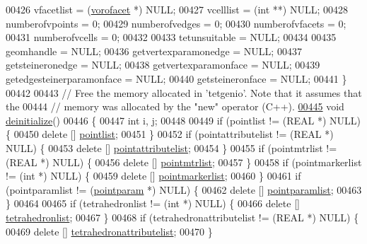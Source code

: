 \begin{DoxyCode}
00426     vfacetlist = (\hyperlink{structtetgenio_1_1vorofacet}{vorofacet} *) NULL; 
00427     vcelllist = (\textcolor{keywordtype}{int} **) NULL; 
00428     numberofvpoints = 0;
00429     numberofvedges = 0;
00430     numberofvfacets = 0;
00431     numberofvcells = 0;
00432 
00433     tetunsuitable = NULL;
00434 
00435     geomhandle = NULL;
00436     getvertexparamonedge = NULL;
00437     getsteineronedge = NULL;
00438     getvertexparamonface = NULL;
00439     getedgesteinerparamonface = NULL;
00440     getsteineronface = NULL;
00441   \}
00442 
00443   \textcolor{comment}{// Free the memory allocated in 'tetgenio'.  Note that it assumes that the }
00444   \textcolor{comment}{//   memory was allocated by the "new" operator (C++).}
\hypertarget{tetgen_8h_source.tex_l00445}{}\hyperlink{classtetgenio_afcc5a8855570b36717070f3f47e3ef2a}{00445}   \textcolor{keywordtype}{void} \hyperlink{classtetgenio_afcc5a8855570b36717070f3f47e3ef2a}{deinitialize}()
00446   \{
00447     \textcolor{keywordtype}{int} i, j;
00448 
00449     \textcolor{keywordflow}{if} (pointlist != (REAL *) NULL) \{
00450       \textcolor{keyword}{delete} [] \hyperlink{classtetgenio_a69b1e0f645f57281d838569c2bbc5789}{pointlist};
00451     \}
00452     \textcolor{keywordflow}{if} (pointattributelist != (REAL *) NULL) \{
00453       \textcolor{keyword}{delete} [] \hyperlink{classtetgenio_a4273b235ec6260723bae849c3184ae6f}{pointattributelist};
00454     \}
00455     \textcolor{keywordflow}{if} (pointmtrlist != (REAL *) NULL) \{
00456       \textcolor{keyword}{delete} [] \hyperlink{classtetgenio_adc248b0a839167ad5389711798613114}{pointmtrlist};
00457     \}
00458     \textcolor{keywordflow}{if} (pointmarkerlist != (\textcolor{keywordtype}{int} *) NULL) \{
00459       \textcolor{keyword}{delete} [] \hyperlink{classtetgenio_afc154d429cb5344b1ea12318b094a2c8}{pointmarkerlist};
00460     \}
00461     \textcolor{keywordflow}{if} (pointparamlist != (\hyperlink{structtetgenio_1_1pointparam}{pointparam} *) NULL) \{
00462       \textcolor{keyword}{delete} [] \hyperlink{classtetgenio_ab7bc1e01d32b9c2f9537ccecac5a4a04}{pointparamlist};
00463     \}
00464 
00465     \textcolor{keywordflow}{if} (tetrahedronlist != (\textcolor{keywordtype}{int} *) NULL) \{
00466       \textcolor{keyword}{delete} [] \hyperlink{classtetgenio_ae53a07184487b2635d0f332ff818d938}{tetrahedronlist};
00467     \}
00468     \textcolor{keywordflow}{if} (tetrahedronattributelist != (REAL *) NULL) \{
00469       \textcolor{keyword}{delete} [] \hyperlink{classtetgenio_aeae735f4584f63311f1c9d46530eefe1}{tetrahedronattributelist};
00470     \}

\end{DoxyCode}
